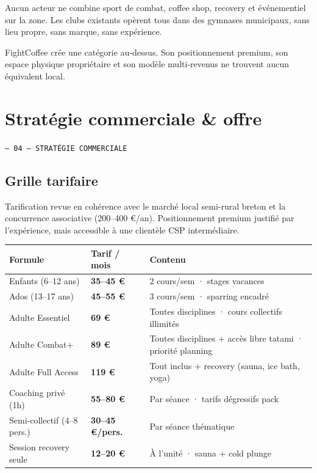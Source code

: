 \documentclass[11pt, a4paper]{article}
\newcommand{\eyebrow}[1]{%
  \vspace{4pt}
  {\small\color{fc-ink3}\texttt{— #1}}
  \vspace{2pt}
}
\newcommand{\redcell}[1]{\textcolor{fc-red}{\textbf{#1}}}
\begin{document}
Aucun acteur ne combine sport de combat, coffee shop, recovery et événementiel sur la zone. Les clubs existants opèrent tous dans des gymnases municipaux, sans lieu propre, sans marque, sans expérience.

FightCoffee crée une catégorie au-dessus. Son positionnement premium, son espace physique propriétaire et son modèle multi-revenus ne trouvent aucun équivalent local.

\section{Stratégie commerciale \& offre}
\eyebrow{04 — STRATÉGIE COMMERCIALE}

\subsection{Grille tarifaire}

Tarification revue en cohérence avec le marché local semi-rural breton et la concurrence associative (200–400 €/an). Positionnement premium justifié par l'expérience, mais accessible à une clientèle CSP intermédiaire.

\begin{center}
\begin{tabular}{@{}p{4.5cm}p{2.8cm}p{5.5cm}@{}}
\toprule
\rowcolor{fc-ink}\color{white}\textbf{Formule} & \color{white}\textbf{Tarif / mois} & \color{white}\textbf{Contenu} \\
\midrule
Enfants (6–12 ans) & \redcell{35–45 €} & 2 cours/sem · stages vacances \\
\rowcolor{fc-bg2} Ados (13–17 ans) & \redcell{45–55 €} & 3 cours/sem · sparring encadré \\
Adulte Essentiel & \redcell{69 €} & Toutes disciplines · cours collectifs illimités \\
\rowcolor{fc-bg2} Adulte Combat+ & \redcell{89 €} & Toutes disciplines + accès libre tatami · priorité planning \\
Adulte Full Access & \redcell{119 €} & Tout inclus + recovery (sauna, ice bath, yoga) \\
\rowcolor{fc-bg2} Coaching privé (1h) & \redcell{55–80 €} & Par séance · tarifs dégressifs pack \\
Semi-collectif (4–8 pers.) & \redcell{30–45 €/pers.} & Par séance thématique \\
\rowcolor{fc-bg2} Session recovery seule & \redcell{12–20 €} & À l'unité · sauna + cold plunge \\
\bottomrule
\end{tabular}
\end{center}
\end{document}
